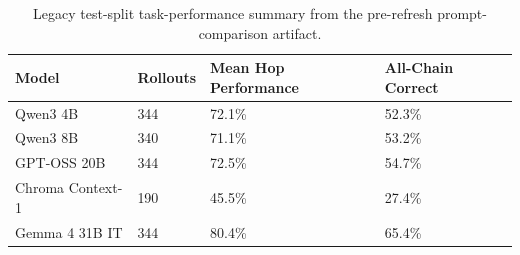 \begin{table}[t]
\small
\centering
\begin{tabular}{llll}
\toprule
\textbf{Model} & \textbf{Rollouts} & \textbf{Mean Hop Performance} & \textbf{All-Chain Correct} \\
\midrule
Qwen3 4B & 344 & 72.1\% & 52.3\% \\
Qwen3 8B & 340 & 71.1\% & 53.2\% \\
GPT-OSS 20B & 344 & 72.5\% & 54.7\% \\
Chroma Context-1 & 190 & 45.5\% & 27.4\% \\
Gemma 4 31B IT & 344 & 80.4\% & 65.4\% \\
\bottomrule
\end{tabular}
\caption{Legacy test-split task-performance summary from the pre-refresh prompt-comparison artifact.}
\label{tab:legacy_task_performance_test}
\end{table}
